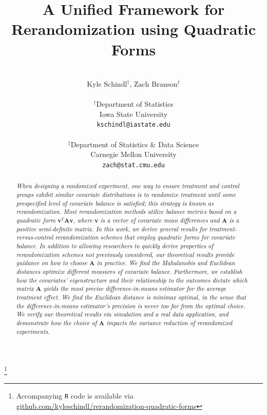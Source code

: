 \documentclass[11pt,twoside]{article}
\theoremstyle{definition}
\theoremstyle{remark}
\newcommand\blfootnote[1]{%
  \begingroup
  \renewcommand\thefootnote{}%
  \footnote{#1}%
  \addtocounter{footnote}{-1}%
  \endgroup
}
\begin{document}
\def\spacingset#1{\renewcommand{\baselinestretch}%
{#1}\small\normalsize} \spacingset{1}

\raggedbottom
\allowdisplaybreaks[1]


  
  \title{\vspace*{-.4in} {A Unified Framework for Rerandomization using Quadratic Forms}}
   \author{\\ $\text{Kyle Schindl}^{\dagger}$, $\text{Zach Branson}^{\ddag}$ \\ \\
    $^{\dag}$Department of Statistics \\
    Iowa State University \\
    \texttt{kschindl@iastate.edu} \\ \\ 
    $^\ddag$Department of Statistics \& Data Science \\
    Carnegie Mellon University \\
    \texttt{zach@stat.cmu.edu}
\date{}
    }

  \maketitle
  \blfootnote{Accompanying \texttt{R} code is available via \href{https://github.com/kyleschindl/rerandomization-quadratic-forms}{github.com/kyleschindl/rerandomization-quadratic-forms}}
  \thispagestyle{empty}
\spacingset{1.2}
\begin{abstract}
{\em When designing a randomized experiment, one way to ensure treatment and control groups exhibit similar covariate distributions is to randomize treatment until some prespecified level of covariate balance is satisfied; this strategy is known as rerandomization. Most rerandomization methods utilize balance metrics based on a quadratic form $\mathbf{v}^T \mathbf{A} \mathbf{v}$, where $\mathbf{v}$ is a vector of covariate mean differences and $\mathbf{A}$ is a positive semi-definite matrix. In this work, we derive general results for treatment-versus-control rerandomization schemes that employ quadratic forms for covariate balance. In addition to allowing researchers to quickly derive properties of rerandomization schemes not previously considered, our theoretical results provide guidance on how to choose $\mathbf{A}$ in practice. We find the Mahalanobis and Euclidean distances optimize different measures of covariate balance. Furthermore, we establish how the covariates' eigenstructure and their relationship to the outcomes dictate which matrix $\mathbf{A}$ yields the most precise difference-in-means estimator for the average treatment effect. We find the Euclidean distance is minimax optimal, in the sense that the difference-in-means estimator's precision is never too far from the optimal choice. We verify our theoretical results via simulation and a real data application, and demonstrate how the choice of $\mathbf{A}$ impacts the variance reduction of rerandomized experiments.}
\end{abstract}
\end{document}
